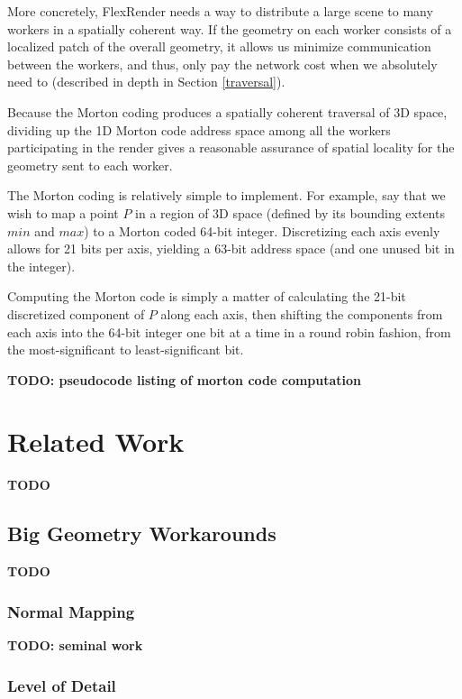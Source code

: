 \documentclass[12pt]{ucthesis}
\begin{document}
More concretely, FlexRender needs a way to distribute a large scene to many
workers in a spatially coherent way. If the geometry on each worker consists
of a localized patch of the overall geometry, it allows us minimize communication
between the workers, and thus, only pay the network cost when we absolutely need
to (described in depth in Section \ref{traversal}).

Because the Morton coding produces a spatially coherent traversal of 3D space,
dividing up the 1D Morton code address space among all the workers participating
in the render gives a reasonable assurance of spatial locality for the geometry
sent to each worker.

The Morton coding is relatively simple to implement. For example, say that
we wish to map a point $P$ in a region of 3D space (defined by its bounding extents
$min$ and $max$) to a Morton coded 64-bit integer. Discretizing each axis evenly
allows for 21 bits per axis, yielding a 63-bit address space (and one unused bit
in the integer).

Computing the Morton code is simply a matter of calculating the 21-bit discretized
component of $P$ along each axis, then shifting the components from each axis
into the 64-bit integer one bit at a time in a round robin fashion, from the
most-significant to least-significant bit.

\textbf{TODO: pseudocode listing of morton code computation}

\chapter{Related Work}
\label{relatedwork}

\textbf{TODO}

\section{Big Geometry Workarounds}
\label{managingcomplexity}

\textbf{TODO}

\subsection{Normal Mapping}
\label{normalmaps}

\textbf{TODO: seminal work}

\subsection{Level of Detail}
\label{levelofdetail}
\end{document}
